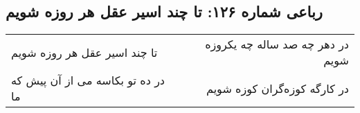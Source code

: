 \begin{center}
\section*{رباعی شماره ۱۲۶: تا چند اسیر عقل هر روزه شویم}
\label{sec:sh126}
\begin{longtable}{l p{0.5cm} r}
تا چند اسیر عقل هر روزه شویم
&&
در دهر چه صد ساله چه یکروزه شویم
\\
در ده تو بکاسه می از آن پیش که ما
&&
در کارگه کوزه‌گران کوزه شویم
\\
\end{longtable}
\end{center}

